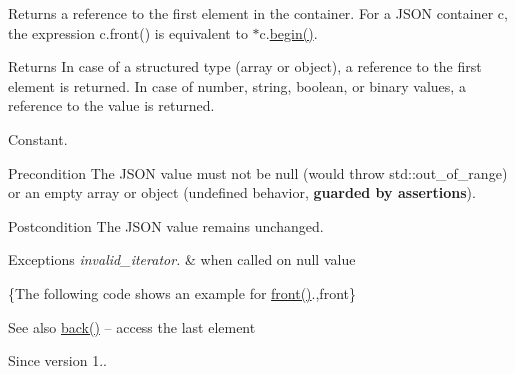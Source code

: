 Returns a reference to the first element in the container. For a J\+S\+ON container {\ttfamily c}, the expression {\ttfamily c.\+front()} is equivalent to {\ttfamily $\ast$c.\hyperlink{classnlohmann_1_1basic__json_a23b495b4c282e4afacf382f5b49af7c7}{begin()}}.

\begin{DoxyReturn}{Returns}
In case of a structured type (array or object), a reference to the first element is returned. In case of number, string, boolean, or binary values, a reference to the value is returned.
\end{DoxyReturn}
Constant.

\begin{DoxyPrecond}{Precondition}
The J\+S\+ON value must not be {\ttfamily null} (would throw {\ttfamily std\+::out\+\_\+of\+\_\+range}) or an empty array or object (undefined behavior, {\bfseries guarded by assertions}). 
\end{DoxyPrecond}
\begin{DoxyPostcond}{Postcondition}
The J\+S\+ON value remains unchanged.
\end{DoxyPostcond}

\begin{DoxyExceptions}{Exceptions}
{\em invalid\+\_\+iterator.} & when called on {\ttfamily null} value\\
\hline
\end{DoxyExceptions}
\{The following code shows an example for {\ttfamily \hyperlink{classnlohmann_1_1basic__json_a5417ca43ae5e7a3a2f82eee2d915c6ed}{front()}}.,front\}

\begin{DoxySeeAlso}{See also}
\hyperlink{classnlohmann_1_1basic__json_a30914ad0767ccdc3633f88a906ed7dfa}{back()} -- access the last element
\end{DoxySeeAlso}
\begin{DoxySince}{Since}
version 1.. 
\end{DoxySince}
